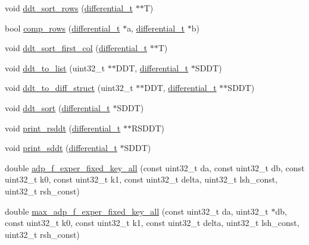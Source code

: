 \begin{DoxyCompactItemize}
\item 
void \hyperlink{adp-tea-f-fk-ddt_8cc_ae2648d869a0e829edcd50795485f601a}{ddt\-\_\-sort\-\_\-rows} (\hyperlink{structdifferential__t}{differential\-\_\-t} $\ast$$\ast$\-T)
\item 
bool \hyperlink{adp-tea-f-fk-ddt_8cc_a8170accc84159941657fd6f5d26cf934}{comp\-\_\-rows} (\hyperlink{structdifferential__t}{differential\-\_\-t} $\ast$a, \hyperlink{structdifferential__t}{differential\-\_\-t} $\ast$b)
\item 
void \hyperlink{adp-tea-f-fk-ddt_8cc_a3670224453681d2f7ba2c30ac943e0df}{ddt\-\_\-sort\-\_\-first\-\_\-col} (\hyperlink{structdifferential__t}{differential\-\_\-t} $\ast$$\ast$\-T)
\item 
void \hyperlink{adp-tea-f-fk-ddt_8cc_a8df073a51fe2d186f4b906a32aa12358}{ddt\-\_\-to\-\_\-list} (uint32\-\_\-t $\ast$$\ast$\-D\-D\-T, \hyperlink{structdifferential__t}{differential\-\_\-t} $\ast$\-S\-D\-D\-T)
\item 
void \hyperlink{adp-tea-f-fk-ddt_8cc_aed88c10880d1cccbd59fb73cda9b73a5}{ddt\-\_\-to\-\_\-diff\-\_\-struct} (uint32\-\_\-t $\ast$$\ast$\-D\-D\-T, \hyperlink{structdifferential__t}{differential\-\_\-t} $\ast$$\ast$\-S\-D\-D\-T)
\item 
void \hyperlink{adp-tea-f-fk-ddt_8cc_abdac451896b7ea3af93445baddf6dfe2}{ddt\-\_\-sort} (\hyperlink{structdifferential__t}{differential\-\_\-t} $\ast$\-S\-D\-D\-T)
\item 
void \hyperlink{adp-tea-f-fk-ddt_8cc_a322003a873ab463e906e45cb30cd9f78}{print\-\_\-rsddt} (\hyperlink{structdifferential__t}{differential\-\_\-t} $\ast$$\ast$\-R\-S\-D\-D\-T)
\item 
void \hyperlink{adp-tea-f-fk-ddt_8cc_a0fa6898489cbc273789ac98e7a9abefb}{print\-\_\-sddt} (\hyperlink{structdifferential__t}{differential\-\_\-t} $\ast$\-S\-D\-D\-T)
\item 
double \hyperlink{adp-tea-f-fk-ddt_8cc_a705378e71f93b36fff9a8b543f6b963d}{adp\-\_\-f\-\_\-exper\-\_\-fixed\-\_\-key\-\_\-all} (const uint32\-\_\-t da, const uint32\-\_\-t db, const uint32\-\_\-t k0, const uint32\-\_\-t k1, const uint32\-\_\-t delta, uint32\-\_\-t lsh\-\_\-const, uint32\-\_\-t rsh\-\_\-const)
\item 
double \hyperlink{adp-tea-f-fk-ddt_8cc_a900cf5610b1e2d1bde8d81f865217a33}{max\-\_\-adp\-\_\-f\-\_\-exper\-\_\-fixed\-\_\-key\-\_\-all} (const uint32\-\_\-t da, uint32\-\_\-t $\ast$db, const uint32\-\_\-t k0, const uint32\-\_\-t k1, const uint32\-\_\-t delta, uint32\-\_\-t lsh\-\_\-const, uint32\-\_\-t rsh\-\_\-const)

\end{DoxyCompactItemize}

